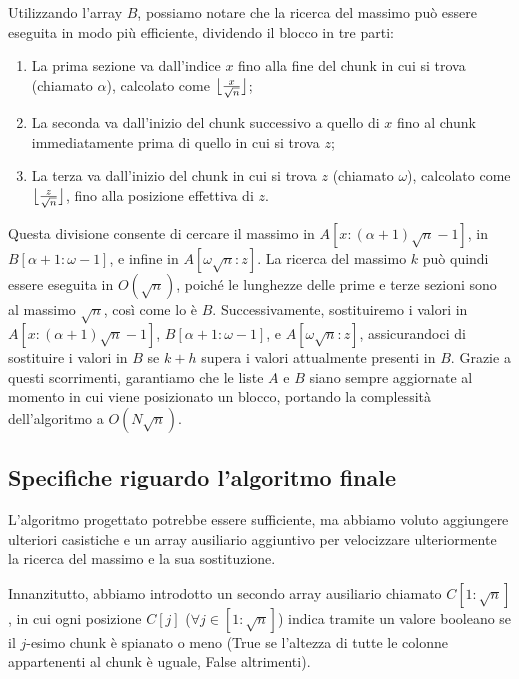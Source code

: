 \documentclass{article}
\begin{document}
Utilizzando l'array $B$, possiamo notare che la ricerca del massimo può essere eseguita in modo più efficiente, dividendo il blocco in tre parti:

\begin{enumerate}
	\item La prima sezione va dall'indice $x$ fino alla fine del chunk in cui si trova (chiamato $\alpha$), calcolato come $\bigl\lfloor { x\over \sqrt{n} }\bigr\rfloor$;
	\item La seconda va dall'inizio del chunk successivo a quello di $x$ fino al chunk immediatamente prima di quello in cui si trova $z$;
	\item La terza va dall'inizio del chunk in cui si trova $z$ (chiamato $\omega$), calcolato come $\bigl\lfloor { z \over \sqrt{n} }\bigr\rfloor$, fino alla posizione effettiva di $z$.
\end{enumerate}

Questa divisione consente di cercare il massimo in $A[x:(\alpha + 1) \sqrt{n} - 1]$, in $B[\alpha + 1:\omega - 1]$, e infine in $A[\omega \sqrt{n}:z]$. La ricerca del massimo $k$ può quindi essere eseguita in $O(\sqrt{n})$, poiché le lunghezze delle prime e terze sezioni sono al massimo $\sqrt{n}$, così come lo è $B$. Successivamente, sostituiremo i valori in $A[x:(\alpha + 1) \sqrt{n} - 1]$, $B[\alpha + 1:\omega - 1]$, e $A[\omega \sqrt{n}:z]$, assicurandoci di sostituire i valori in $B$ se $k + h$ supera i valori attualmente presenti in $B$. Grazie a questi scorrimenti, garantiamo che le liste $A$ e $B$ siano sempre aggiornate al momento in cui viene posizionato un blocco, portando la complessità dell'algoritmo a $O(N\sqrt{n})$.

\subsection{Specifiche riguardo l'algoritmo finale}

L'algoritmo progettato potrebbe essere sufficiente, ma abbiamo voluto aggiungere ulteriori casistiche e un array ausiliario aggiuntivo per velocizzare ulteriormente la ricerca del massimo e la sua sostituzione.

Innanzitutto, abbiamo introdotto un secondo array ausiliario chiamato $C[1:\sqrt{n}]$, in cui ogni posizione $C[j]$ ($\forall j \in [1:\sqrt{n}]$) indica tramite un valore booleano se il $j$-esimo chunk è spianato o meno (True se l'altezza di tutte le colonne appartenenti al chunk è uguale, False altrimenti).
\end{document}
